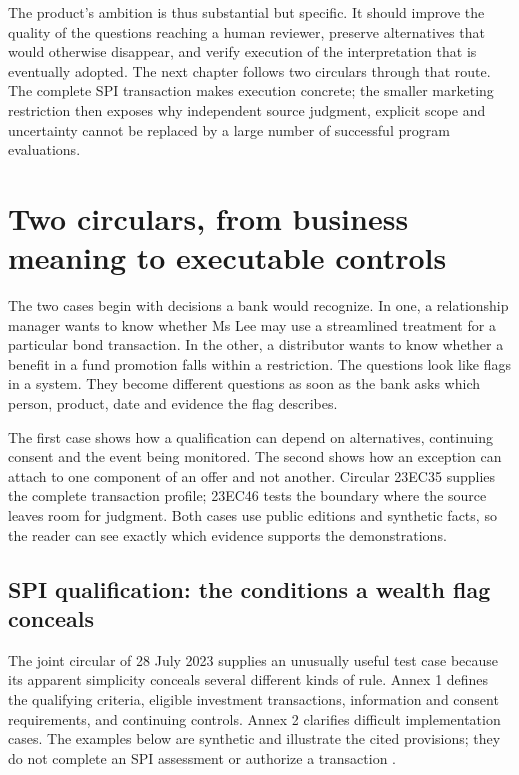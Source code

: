 \documentclass[12pt,a4paper,oneside,openany]{book}
\begin{document}
The product's ambition is thus substantial but specific. It should improve the
quality of the questions reaching a human reviewer, preserve alternatives that
would otherwise disappear, and verify execution of the interpretation that is
eventually adopted. The next chapter follows two circulars through that route. The complete
SPI transaction makes execution concrete; the smaller marketing restriction
then exposes why independent source judgment, explicit scope and uncertainty
cannot be replaced by a large number of successful program evaluations.

\chapter{Two circulars, from business meaning to executable controls}
\label{ch:circular}

The two cases begin with decisions a bank would recognize. In one, a relationship
manager wants to know whether Ms Lee may use a streamlined treatment for a
particular bond transaction. In the other, a distributor wants to know whether
a benefit in a fund promotion falls within a restriction. The questions look
like flags in a system. They become different questions as soon as the bank asks
which person, product, date and evidence the flag describes.

The first case shows how a qualification can depend on alternatives, continuing
consent and the event being monitored. The second shows how an exception can
attach to one component of an offer and not another. Circular 23EC35 supplies
the complete transaction profile; 23EC46 tests the boundary where the source
leaves room for judgment. Both cases use public editions and synthetic facts, so
the reader can see exactly which evidence supports the demonstrations.

\section{SPI qualification: the conditions a wealth flag conceals}
\label{merge:P-01-problem:02}

\label{sec:spi}

The joint circular of 28 July 2023 supplies an unusually useful test case because
its apparent simplicity conceals several different kinds of rule. Annex 1
defines the qualifying criteria, eligible investment transactions, information
and consent requirements, and continuing controls. Annex 2 clarifies difficult
implementation cases. The examples below are synthetic and illustrate the cited
provisions; they do not complete an SPI assessment or authorize a transaction
\citep{sfcspi,sfcspiannex1,sfcspiannex2}.
\end{document}
